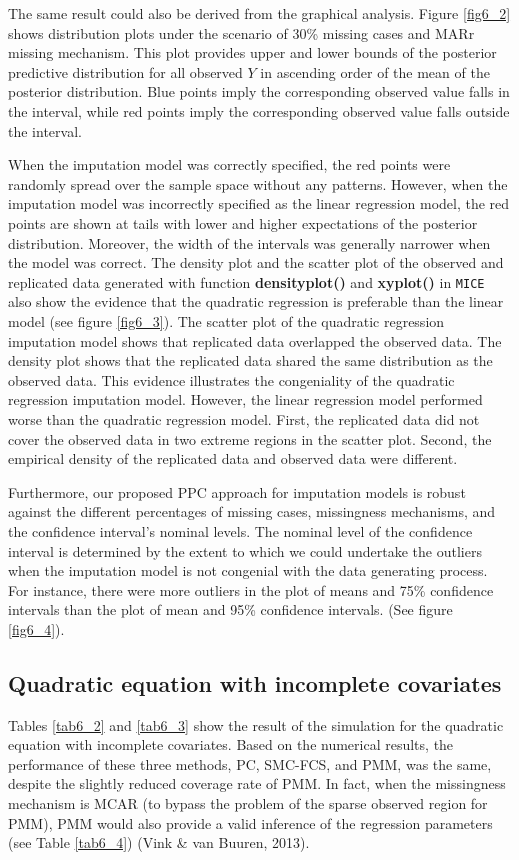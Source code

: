 \documentclass[12pt, fullpage, a4paper]{article}
\begin{document}
The same result could also be derived from the graphical analysis. Figure \ref{fig6_2} shows distribution plots under the scenario of 30\% missing cases and MARr missing mechanism. This plot provides upper and lower bounds of the posterior predictive distribution for all observed $Y$ in ascending order of the mean of the posterior distribution. Blue points imply the corresponding observed value falls in the interval, while red points imply the corresponding observed value falls outside the interval. 

When the imputation model was correctly specified, the red points were randomly spread over the sample space without any patterns. However, when the imputation model was incorrectly specified as the linear regression model, the red points are shown at tails with lower and higher expectations of the posterior distribution. Moreover, the width of the intervals was generally narrower when the model was correct. The density plot and the scatter plot of the observed and replicated data generated with function \textbf{densityplot()} and \textbf{xyplot()} in \texttt{MICE} also show the evidence that the quadratic regression is preferable than the linear model (see figure \ref{fig6_3}). The scatter plot of the quadratic regression imputation model shows that replicated data overlapped the observed data. The density plot shows that the replicated data shared the same distribution as the observed data. This evidence illustrates the congeniality of the quadratic regression imputation model. However, the linear regression model performed worse than the quadratic regression model. First, the replicated data did not cover the observed data in two extreme regions in the scatter plot. Second, the empirical density of the replicated data and observed data were different. 

Furthermore, our proposed PPC approach for imputation models is robust against the different percentages of missing cases, missingness mechanisms, and the confidence interval's nominal levels. The nominal level of the confidence interval is determined by the extent to which we could undertake the outliers when the imputation model is not congenial with the data generating process. For instance, there were more outliers in the plot of means and 75\% confidence intervals than the plot of mean and 95\% confidence intervals. (See figure \ref{fig6_4}). 



\subsection{Quadratic equation with incomplete covariates}
Tables \ref{tab6_2} and \ref{tab6_3} show the result of the simulation for the quadratic equation with incomplete covariates. Based on the numerical results, the performance of these three methods, PC, SMC-FCS, and PMM, was the same, despite the slightly reduced coverage rate of PMM. In fact, when the missingness mechanism is MCAR (to bypass the problem of the sparse observed region for PMM), PMM would also provide a valid inference of the regression parameters (see Table \ref{tab6_4}) (Vink \& van Buuren, 2013)\nocite{Vink2013}.
\end{document}
